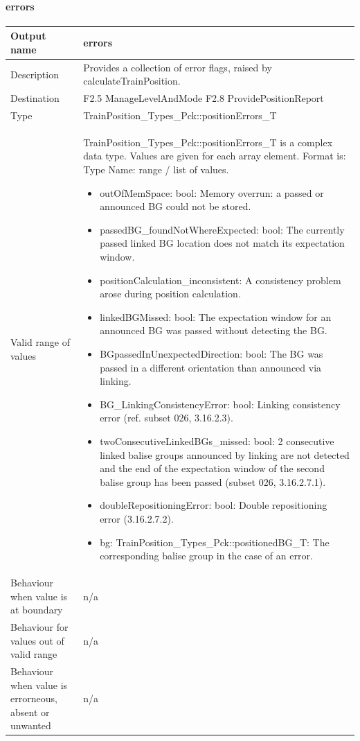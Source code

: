\paragraph{errors}

\begin{longtable}{p{}p{}}
\toprule
Output name				& errors \\
\midrule
Description				& Provides a collection of error flags, raised by calculateTrainPosition.   \\
\midrule
Destination				& F2.5 ManageLevelAndMode\newline
F2.8 ProvidePositionReport \\ 
\midrule
Type					& TrainPosition\_Types\_Pck::positionErrors\_T \\  
\midrule
Valid range of values	& TrainPosition\_Types\_Pck::positionErrors\_T is a complex data type. Values are given for each array element. Format is: Type Name: range / list of values.
\begin{itemize}
\item outOfMemSpace: bool: Memory overrun: a passed or announced BG could not be stored.
\item passedBG\_foundNotWhereExpected: bool: The currently passed linked BG location does not match its expectation window.
\item positionCalculation\_inconsistent: A consistency problem arose during position calculation.
\item linkedBGMissed: bool: The expectation window for an announced BG was passed without detecting the BG.
\item BGpassedInUnexpectedDirection: bool: The BG was passed in a different orientation than announced via linking.
\item BG\_LinkingConsistencyError: bool: Linking consistency error (ref. subset 026, 3.16.2.3).
\item twoConsecutiveLinkedBGs\_missed: bool: 2 consecutive linked balise groups announced by linking are not detected and the end of the expectation window of the second balise group has been passed (subset 026, 3.16.2.7.1).
\item doubleRepositioningError: bool: Double repositioning error (3.16.2.7.2).
\item bg: TrainPosition\_Types\_Pck::positionedBG\_T: The corresponding balise group in the case of an error.
\end{itemize}  \\
\midrule
Behaviour when value is at boundary		& n/a \\
\midrule
Behaviour for values out of valid range	& n/a \\
\midrule
Behaviour when value is errorneous, absent or unwanted & n/a \\
\bottomrule
\end{longtable}


